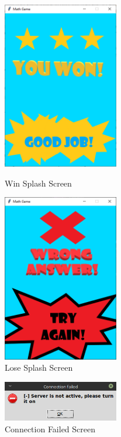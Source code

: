 \documentclass[12pt]{article}
\begin{document}
\begin{figure}[htbp]
    \centering
    \includegraphics[width=0.45\textwidth]{Win.PNG}
    \caption{Win Splash Screen}

    \vspace*{\floatsep}

    \includegraphics[width=0.45\textwidth]{Lose.PNG}
    \caption{Lose Splash Screen}
\end{figure}


\begin{figure}[htbp]
    \centering
    \includegraphics[width=0.45\textwidth]{connection-failed.PNG}
    \caption{Connection Failed Screen}

\end{figure}
\end{document}
